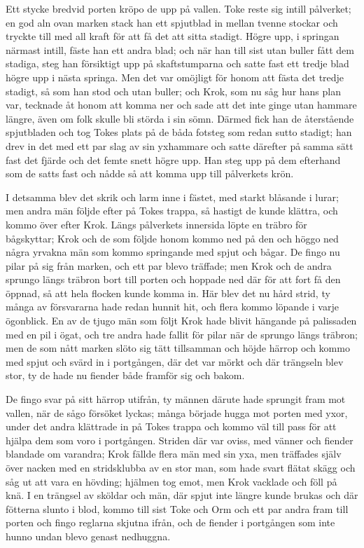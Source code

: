 \initial Ett stycke bredvid porten kröpo de upp på vallen. Toke reste sig intill pålverket; en god aln ovan marken stack han ett spjutblad in mellan tvenne stockar och tryckte till med all kraft för att få det att sitta stadigt. Högre upp, i springan närmast intill, fäste han ett andra blad; och när han till sist utan buller fått dem stadiga, steg han försiktigt upp på skaftstumparna och satte fast ett tredje blad högre upp i nästa springa. Men det var omöjligt för honom att fästa det tredje stadigt, så som han stod och utan buller; och Krok, som nu såg hur hans plan var, tecknade åt honom att komma ner och sade att det inte ginge utan hammare längre, även om folk skulle bli störda i sin sömn. Därmed fick han de återstående spjutbladen och tog Tokes plats på de båda fotsteg som redan sutto stadigt; han drev in det med ett par slag av sin yxhammare och satte därefter på samma sätt fast det fjärde och det femte snett högre upp. Han steg upp på dem efterhand som de satts fast och nådde så att komma upp till pålverkets krön.

\initial I detsamma blev det skrik och larm inne i fästet, med starkt blåsande i lurar; men andra män följde efter på Tokes trappa, så hastigt de kunde klättra, och kommo över efter Krok. Längs pålverkets innersida löpte en träbro för bågskyttar; Krok och de som följde honom kommo ned på den och höggo ned några yrvakna män som kommo springande med spjut och bågar. De fingo nu pilar på sig från marken, och ett par blevo träffade; men Krok och de andra sprungo längs träbron bort till porten och hoppade ned där för att fort få den öppnad, så att hela flocken kunde komma in. Här blev det nu hård strid, ty många av försvararna hade redan hunnit hit, och flera kommo löpande i varje ögonblick. En av de tjugo män som följt Krok hade blivit hängande på palissaden med en pil i ögat, och tre andra hade fallit för pilar när de sprungo längs träbron; men de som nått marken slöto sig tätt tillsamman och höjde härrop och kommo med spjut och svärd in i portgången, där det var mörkt och där trängseln blev stor, ty de hade nu fiender både framför sig och bakom.

\initial De fingo svar på sitt härrop utifrån, ty männen därute hade sprungit fram mot vallen, när de sågo försöket lyckas; många började hugga mot porten med yxor, under det andra klättrade in på Tokes trappa och kommo väl till pass för att hjälpa dem som voro i portgången. Striden där var oviss, med vänner och fiender blandade om varandra; Krok fällde flera män med sin yxa, men träffades själv över nacken med en stridsklubba av en stor man, som hade svart flätat skägg och såg ut att vara en hövding; hjälmen tog emot, men Krok vacklade och föll på knä. I en trängsel av sköldar och män, där spjut inte längre kunde brukas och där fötterna slunto i blod, kommo till sist Toke och Orm och ett par andra fram till porten och fingo reglarna skjutna ifrån, och de fiender i portgången som inte hunno undan blevo genast nedhuggna.

